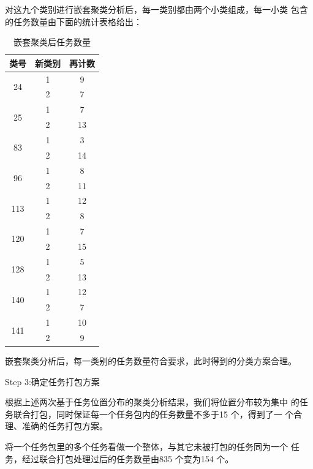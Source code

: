 对这九个类别进行嵌套聚类分析后，每一类别都由两个小类组成，每一小类
包含的任务数量由下面的统计表格给出：
\begin{longtable}[c]{ccc}
    \caption{嵌套聚类后任务数量}
    \label{tab:my-table}\\
    \hline
    类号                   & 新类别 & 再计数 \\ \hline
    \endfirsthead
    \endhead
    \multirow{2}{*}{24}  & 1   & 9   \\
                         & 2   & 7   \\ \hline
    \multirow{2}{*}{25}  & 1   & 7   \\
                         & 2   & 13  \\ \hline
    \multirow{2}{*}{83}  & 1   & 3   \\
                         & 2   & 14  \\ \hline
    \multirow{2}{*}{96}  & 1   & 8   \\
                         & 2   & 11  \\ \hline
    \multirow{2}{*}{113} & 1   & 12  \\
                         & 2   & 8   \\ \hline
    \multirow{2}{*}{120} & 1   & 7   \\
                         & 2   & 15  \\ \hline
    \multirow{2}{*}{128} & 1   & 5   \\
                         & 2   & 13  \\ \hline
    \multirow{2}{*}{140} & 1   & 12  \\
                         & 2   & 7   \\ \hline
    \multirow{2}{*}{141} & 1   & 10  \\
                         & 2   & 9   \\ \hline
    \end{longtable}
嵌套聚类分析后，每一类别的任务数量符合要求，此时得到的分类方案合理。


Step 3:确定任务打包方案

根据上述两次基于任务位置分布的聚类分析结果，我们将位置分布较为集中
的任务联合打包，同时保证每一个任务包内的任务数量不多于15 个，得到了一
个合理、准确的任务打包方案。

将一个任务包里的多个任务看做一个整体，与其它未被打包的任务同为一个
任务，经过联合打包处理过后的任务数量由835 个变为154 个。
